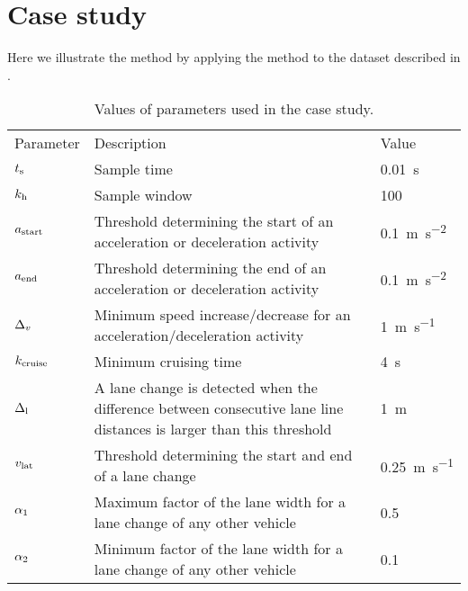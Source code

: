 \section{Case study}
\label{sec:case study}

Here we illustrate the method by applying the method to the dataset described in \autocite{paardekooper2019dataset6000km}.

\begin{table}
	\centering
	\caption{\cstartc Values of parameters used in the case study. \cendc}
	\label{tab:parameters}
	\cstartc
	\begin{tabularx}{\linewidth}{lXl}
		\toprule
		Parameter & Description & Value \\ \otoprule
		$t_\mathrm{s}$ & Sample time & \SI{0.01}{\second} \\
		$k_{\mathrm{h}}$ & Sample window & 100 \\
		$a_\mathrm{start}$ & Threshold determining the start of an acceleration or deceleration activity & \SI{0.1}{\meter\per\second\squared} \\
		$a_\mathrm{end}$ & Threshold determining the end of an acceleration or deceleration activity & \SI{0.1}{\meter\per\second\squared} \\
		$\Delta_{v}$ & Minimum speed increase/decrease for an acceleration/deceleration activity & \SI{1}{\meter\per\second} \\
		$k_\mathrm{cruise}$ & Minimum cruising time & \SI{4}{\second} \\
		$\Delta_{\mathrm{l}}$ & A lane change is detected when the difference between consecutive lane line distances is larger than this threshold & \SI{1}{\meter} \\
		$v_{\mathrm{lat}}$ & Threshold determining the start and end of a lane change & \SI{0.25}{\meter\per\second} \\
		$\alpha_1$ & Maximum factor of the lane width for a lane change of any other vehicle & 0.5 \\
		$\alpha_2$ & Minimum factor of the lane width for a lane change of any other vehicle & 0.1 \\
		\bottomrule
	\end{tabularx}
	\cendc
\end{table}



